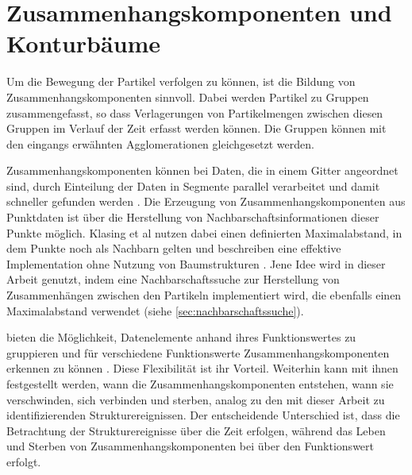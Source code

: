 

\section{Zusammenhangskomponenten und Konturbäume}\label{sec:related:connectedContour}

Um die Bewegung der Partikel verfolgen zu können, ist die Bildung von Zusammenhangskomponenten sinnvoll. Dabei werden Partikel zu Gruppen zusammengefasst, so dass Verlagerungen von Partikelmengen zwischen diesen Gruppen im Verlauf der Zeit erfasst werden können. Die Gruppen können mit den eingangs erwähnten Agglomerationen gleichgesetzt werden.

Zusammenhangskomponenten können bei Daten, die in einem Gitter angeordnet sind, durch Einteilung der Daten in Segmente parallel verarbeitet und damit schneller gefunden werden \cite{trevor2013efficient}. Die Erzeugung von Zusammenhangskomponenten aus Punktdaten ist über die Herstellung von Nachbarschaftsinformationen dieser Punkte möglich. Klasing et al nutzen dabei einen definierten Maximalabstand, in dem Punkte noch als Nachbarn gelten und beschreiben eine effektive Implementation ohne Nutzung von Baumstrukturen \cite{klasing2008efficientSegmentationOf3DLaserData}. %
Jene Idee wird in dieser Arbeit genutzt, indem eine Nachbarschaftssuche zur Herstellung von Zusammenhängen zwischen den Partikeln implementiert wird, die ebenfalls einen Maximalabstand verwendet (siehe \autoref{sec:nachbarschaftssuche}).

 bieten die Möglichkeit, Datenelemente anhand ihres Funktionswertes zu gruppieren und für verschiedene Funktionswerte Zusammenhangskomponenten erkennen zu können \cite{vanKreveld1997isosurfaceTraversal} \cite{bajaj1997contourSpectrum}. Diese Flexibilität ist ihr Vorteil. Weiterhin kann mit ihnen festgestellt werden, wann die Zusammenhangskomponenten entstehen, wann sie verschwinden, sich verbinden und sterben, analog zu den mit dieser Arbeit zu identifizierenden Strukturereignissen. Der entscheidende Unterschied ist, dass die Betrachtung der Strukturereignisse über die Zeit erfolgen, während das Leben und Sterben von Zusammenhangskomponenten bei  über den Funktionswert erfolgt.


